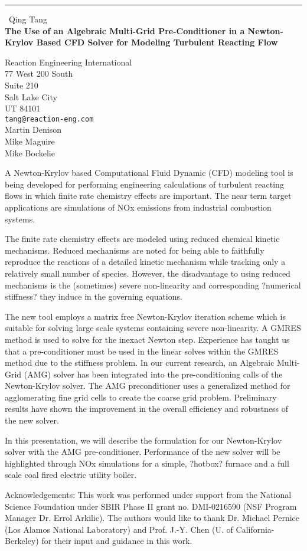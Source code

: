 \documentclass{report}
\begin{document}
\begin{center}
\rule{6in}{1pt} \
{\large Qing Tang \\
{\bf The Use of an Algebraic Multi-Grid Pre-Conditioner in a Newton-Krylov Based CFD Solver for Modeling Turbulent Reacting Flow}}

Reaction Engineering International \\ 77 West 200 South \\ Suite 210 \\ Salt Lake City \\ UT 84101
\\
{\tt tang@reaction-eng.com}\\
Martin Denison\\
Mike Maguire\\
	Mike Bockelie\end{center}

A Newton-Krylov based Computational Fluid Dynamic (CFD) modeling tool is
being developed for performing engineering calculations of turbulent
reacting flows in which finite rate chemistry effects are important. The
near term target applications are simulations of NOx emissions from
industrial combustion systems.

The finite rate chemistry effects are modeled using reduced chemical
kinetic mechanisms. Reduced mechanisms are noted for being able to
faithfully reproduce the reactions of a detailed kinetic mechanism while
tracking only a relatively small number of species. However, the
disadvantage to using reduced mechanisms is the (sometimes) severe
non-linearity and corresponding ?numerical stiffness? they induce in the
governing equations.

The new tool employs a matrix free Newton-Krylov iteration scheme which
is suitable for solving large scale systems containing severe
non-linearity. A GMRES method is used to solve for the inexact Newton
step. Experience has taught us that a pre-conditioner must be used in the
linear solves within the GMRES method due to the stiffness problem. In
our current research, an Algebraic Multi-Grid (AMG) solver has been
integrated into the pre-conditioning calls of the Newton-Krylov solver.
The AMG preconditioner uses a generalized method for agglomerating fine
grid cells to create the coarse grid problem. Preliminary results have
shown the improvement in the overall efficiency and robustness of the new
solver.

In this presentation, we will describe the formulation for our
Newton-Krylov solver with the AMG pre-conditioner. Performance of the new
solver will be highlighted through NOx simulations for a simple, ?hotbox?
furnace and a full scale coal fired electric utility boiler.

Acknowledgements:
This work was performed under support from the National Science
Foundation under SBIR Phase II grant no. DMI-0216590 (NSF Program Manager
Dr. Errol Arkilic). The authors would like to thank Dr. Michael Pernice
(Los Alamos National Laboratory) and Prof. J.-Y. Chen (U. of
California-Berkeley) for their input and guidance in this work.
\end{document}
